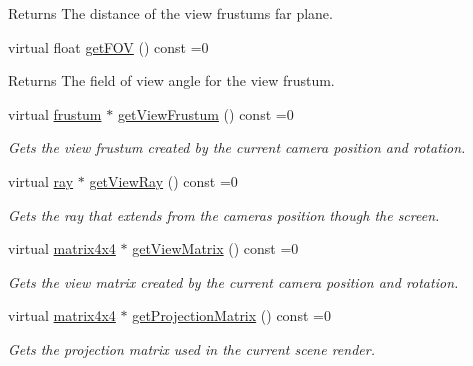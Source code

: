 \begin{DoxyCompactItemize}
\begin{DoxyCompactList}
\begin{DoxyReturn}{Returns}
The distance of the view frustum\textquotesingle{}s far plane. 
\end{DoxyReturn}
\end{DoxyCompactList}\item 
\mbox{\label{classflounder_1_1icamera_a1bf12448ac5ea3ed1ffa7c9a73424dde}} 
virtual float \hyperlink{classflounder_1_1icamera_a1bf12448ac5ea3ed1ffa7c9a73424dde}{get\+F\+OV} () const =0
\begin{DoxyCompactList}\small\item\em \begin{DoxyReturn}{Returns}
The field of view angle for the view frustum. 
\end{DoxyReturn}
\end{DoxyCompactList}\item 
virtual \hyperlink{classflounder_1_1frustum}{frustum} $\ast$ \hyperlink{classflounder_1_1icamera_a854ed7169c5514c18e0bb09e97dfcde6}{get\+View\+Frustum} () const =0
\begin{DoxyCompactList}\small\item\em Gets the view frustum created by the current camera position and rotation. \end{DoxyCompactList}\item 
virtual \hyperlink{classflounder_1_1ray}{ray} $\ast$ \hyperlink{classflounder_1_1icamera_ab2ff70f38f2e5a93223d3590b75a3b77}{get\+View\+Ray} () const =0
\begin{DoxyCompactList}\small\item\em Gets the ray that extends from the cameras position though the screen. \end{DoxyCompactList}\item 
virtual \hyperlink{classflounder_1_1matrix4x4}{matrix4x4} $\ast$ \hyperlink{classflounder_1_1icamera_a95b93e33ce9d02b9ea23f7d7f9205d13}{get\+View\+Matrix} () const =0
\begin{DoxyCompactList}\small\item\em Gets the view matrix created by the current camera position and rotation. \end{DoxyCompactList}\item 
virtual \hyperlink{classflounder_1_1matrix4x4}{matrix4x4} $\ast$ \hyperlink{classflounder_1_1icamera_a271f2b8ade572d193b79abcd8a325b89}{get\+Projection\+Matrix} () const =0
\begin{DoxyCompactList}\small\item\em Gets the projection matrix used in the current scene render. \end{DoxyCompactList}\item 

\end{DoxyCompactItemize}
